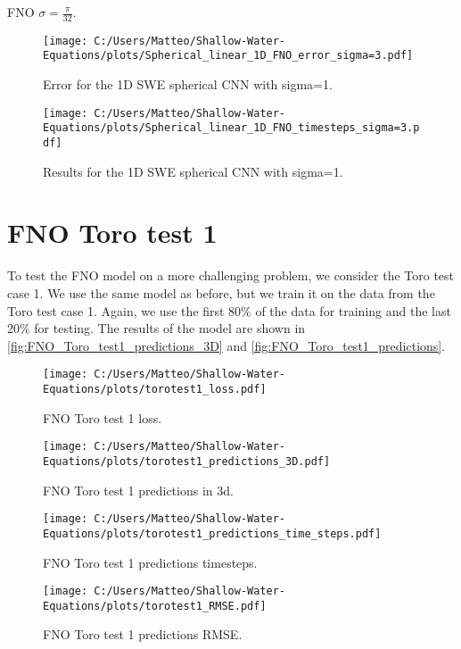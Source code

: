 FNO $\sigma = \frac{\pi}{32}$.
\begin{figure}[H]
    \centering
    \texttt{[image: C:/Users/Matteo/Shallow-Water-Equations/plots/Spherical\_linear\_1D\_FNO\_error\_sigma=3.pdf]}
    \caption{Error for the 1D SWE spherical CNN with sigma=1.}
\end{figure}

\begin{figure}[H]
    \centering
    \texttt{[image: C:/Users/Matteo/Shallow-Water-Equations/plots/Spherical\_linear\_1D\_FNO\_timesteps\_sigma=3.pdf]}
    \caption{Results for the 1D SWE spherical CNN with sigma=1.}
\end{figure}





\section{FNO Toro test 1}
To test the FNO model on a more challenging problem, we consider the Toro test case 1.
We use the same model as before, but we train it on the data from the Toro test case 1.
Again, we use the first $80\%$ of the data for training and the last $20\%$ for testing.
The results of the model are shown in \autoref{fig:FNO_Toro_test1_predictions_3D} and \autoref{fig:FNO_Toro_test1_predictions}.

\begin{figure}[H]
    \centering
    \texttt{[image: C:/Users/Matteo/Shallow-Water-Equations/plots/torotest1\_loss.pdf]}
    \caption{FNO Toro test 1 loss.}\label{fig:FNO_Toro_test1_loss}
\end{figure}

\begin{figure}[H]
    \centering
    \texttt{[image: C:/Users/Matteo/Shallow-Water-Equations/plots/torotest1\_predictions\_3D.pdf]}
    \caption{FNO Toro test 1 predictions in 3d.}\label{fig:FNO_Toro_test1_predictions_3D}
\end{figure}


\begin{figure}[H]
    \centering
    \texttt{[image: C:/Users/Matteo/Shallow-Water-Equations/plots/torotest1\_predictions\_time\_steps.pdf]}
    \caption{FNO Toro test 1 predictions timesteps.}\label{fig:FNO_Toro_test1_predictions_time_steps}
\end{figure}


\begin{figure}[H]
    \centering
    \texttt{[image: C:/Users/Matteo/Shallow-Water-Equations/plots/torotest1\_RMSE.pdf]}
    \caption{FNO Toro test 1 predictions RMSE.}\label{fig:FNO_Toro_test1_rmse}
\end{figure}



